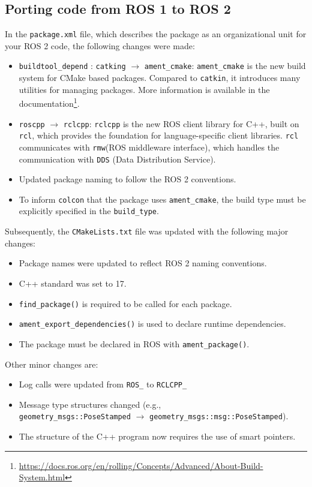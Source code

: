 \subsection{Porting code from ROS 1 to ROS 2}
In the \texttt{package.xml} file, which describes the package as an organizational unit for your ROS 2 code, the following changes were made:
\begin{itemize}
	\item \texttt{buildtool\_depend} : \texttt{catking} $\rightarrow$ \texttt{ament\_cmake}: \texttt{ament\_cmake} is the new build system for CMake based packages. Compared to \texttt{catkin}, it introduces many utilities for managing packages. More information is available in the documentation\footnote{\href{https://docs.ros.org/en/rolling/Concepts/Advanced/About-Build-System.html}{https://docs.ros.org/en/rolling/Concepts/Advanced/About-Build-System.html}}.
	\item \texttt{roscpp} $\rightarrow$ \texttt{rclcpp}: \texttt{rclcpp} is the new ROS client library for C++, built on \texttt{rcl}, which provides the foundation for language-specific client libraries. \texttt{rcl} communicates with \texttt{rmw}(ROS middleware interface), which handles the communication with \texttt{DDS} (Data Distribution Service).
	\item Updated package naming to follow the ROS 2 conventions.
	\item To inform \texttt{colcon} that the package uses \texttt{ament\_cmake}, the build type must be explicitly specified in the \texttt{build\_type}.
\end{itemize}
Subsequently, the \texttt{CMakeLists.txt} file was updated with the following major changes:
\begin{itemize}
	\item Package names were updated to reflect ROS 2 naming conventions.
	\item C++ standard was set to 17.
	\item \texttt{find\_package()} is required to be called for each package.
	\item \texttt{ament\_export\_dependencies()}  is used to declare runtime dependencies.
	\item The package must be declared in ROS with \texttt{ament\_package()}.
\end{itemize}
Other minor changes are:

\begin{itemize}
	\item Log calls were updated from \texttt{ROS\_} to \texttt{RCLCPP\_}
	\item Message type structures changed (e.g.,\\ \texttt{geometry\_msgs::PoseStamped} $\rightarrow$ \texttt{geometry\_msgs::msg::PoseStamped}).
	\item The structure of the C++ program now requires the use of smart pointers.
\end{itemize}

